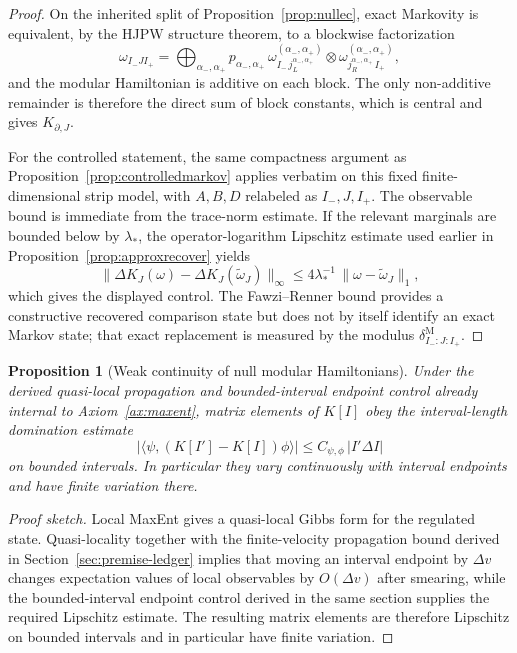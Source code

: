 \documentclass[11pt]{article}
\newtheorem{proposition}[theorem]{Proposition}
\begin{document}
\begin{proof}
On the inherited split of Proposition~\ref{prop:nullec}, exact Markovity is equivalent, by the HJPW structure theorem, to a blockwise factorization
\[
\omega_{I_-JI_+}
=
\bigoplus_{\alpha_-,\alpha_+}
p_{\alpha_-,\alpha_+}\,
\omega_{I_-\,j_L^{\alpha_-,\alpha_+}}^{(\alpha_-,\alpha_+)}
\otimes
\omega_{j_R^{\alpha_-,\alpha_+}\,I_+}^{(\alpha_-,\alpha_+)},
\]
and the modular Hamiltonian is additive on each block. The only non-additive remainder is therefore the direct sum of block constants, which is central and gives \(K_{\partial,J}\).

For the controlled statement, the same compactness argument as Proposition~\ref{prop:controlledmarkov} applies verbatim on this fixed finite-dimensional strip model, with \(A,B,D\) relabeled as \(I_-,J,I_+\). The observable bound is immediate from the trace-norm estimate. If the relevant marginals are bounded below by \(\lambda_\ast\), the operator-logarithm Lipschitz estimate used earlier in Proposition~\ref{prop:approxrecover} yields
\[
\|\Delta K_J(\omega)-\Delta K_J(\widetilde\omega_J)\|_\infty
\le
4\lambda_\ast^{-1}\,
\|\omega-\widetilde\omega_J\|_1,
\]
which gives the displayed control. The Fawzi--Renner bound provides a constructive recovered comparison state but does not by itself identify an exact Markov state; that exact replacement is measured by the modulus \(\delta^{\mathrm M}_{I_-:J:I_+}\).
\end{proof}

\begin{proposition}[Weak continuity of null modular Hamiltonians]\label{prop:n3}
Under the derived quasi-local propagation and bounded-interval endpoint control already internal to Axiom~\ref{ax:maxent}, matrix elements of \(K[I]\) obey the interval-length domination estimate
\[
\bigl|\langle \psi,(K[I']-K[I])\phi\rangle\bigr|
\le
C_{\psi,\phi}\,\lvert I'\Delta I\rvert
\]
on bounded intervals. In particular they vary continuously with interval endpoints and have finite variation there.
\end{proposition}

\begin{proof}[Proof sketch]
Local MaxEnt gives a quasi-local Gibbs form for the regulated state. Quasi-locality together with the finite-velocity propagation bound derived in Section~\ref{sec:premise-ledger} implies that moving an interval endpoint by \(\Delta v\) changes expectation values of local observables by \(O(\Delta v)\) after smearing, while the bounded-interval endpoint control derived in the same section supplies the required Lipschitz estimate. The resulting matrix elements are therefore Lipschitz on bounded intervals and in particular have finite variation.
\end{proof}
\end{document}
